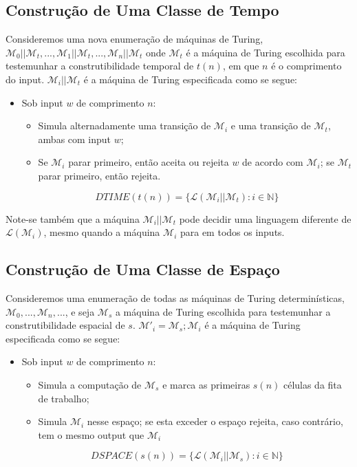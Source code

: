 \documentclass[10pt,a4paper]{report}
\begin{document}
\subsection{Construção de Uma Classe de Tempo}
Consideremos uma nova enumeração de máquinas de Turing, $\mathcal{M}_0||\mathcal{M}_t, ..., \mathcal{M}_1||\mathcal{M}_t, ..., \mathcal{M}_n||\mathcal{M}_t$ onde $\mathcal{M}_t$ é a máquina de Turing escolhida para testemunhar a construtibilidade temporal de $t(n)$, em que $n$ é o comprimento do input. $\mathcal{M}_i||\mathcal{M}_t$ é a máquina de Turing especificada como se segue:
\begin{itemize}
\item Sob input $w$ de comprimento $n$:
\begin{itemize}
\item Simula alternadamente uma transição de $\mathcal{M}_i$ e uma transição de $\mathcal{M}_t$, ambas com input $w$;
\item Se $\mathcal{M}_i$ parar primeiro, então aceita ou rejeita $w$ de acordo com $\mathcal{M}_i$; se $\mathcal{M}_t$ parar primeiro, então rejeita.
\end{itemize}
$$
DTIME(t(n)) = \{\mathcal{L}(\mathcal{M}_i||\mathcal{M}_t) : i \in \mathbb{N}\}
$$
\end{itemize}
Note-se também que a máquina $\mathcal{M}_i||\mathcal{M}_t$ pode decidir uma
linguagem diferente de $\mathcal{L}(\mathcal{M}_i)$, mesmo quando a máquina $\mathcal{M}_i$ para em todos os inputs.
\subsection{Construção de Uma Classe de Espaço}
Consideremos uma enumeração de todas as máquinas de Turing determinísticas, $\mathcal{M}_0, ..., \mathcal{M}_n, ...$, e seja $\mathcal{M}_s$ a máquina de Turing escolhida para testemunhar a construtibilidade espacial de $s$. $\mathcal{M'}_i=\mathcal{M}_s;\mathcal{M}_i$ é a máquina de Turing especificada como se segue:
\begin{itemize}
\item Sob input $w$ de comprimento $n$:
\begin{itemize}
\item Simula a computação de $\mathcal{M}_s$ e marca as primeiras $s(n)$ células da fita de trabalho;
\item Simula $\mathcal{M}_i$ nesse espaço; se esta exceder o espaço rejeita, caso contrário, tem o mesmo output que $\mathcal{M}_i$
\end{itemize}
$$
DSPACE(s(n)) = \{\mathcal{L}(\mathcal{M}_i||\mathcal{M}_s) : i \in \mathbb{N}\}
$$
\end{itemize}
\end{document}
